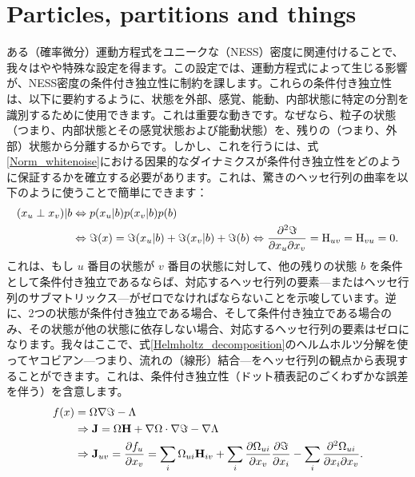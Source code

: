 \documentclass[a4paper, titlepage]{jsarticle}
\begin{document}
\section{Particles, partitions and things}
ある（確率微分）運動方程式をユニークな（NESS）密度に関連付けることで、我々はやや特殊な設定を得ます。この設定では、運動方程式によって生じる影響が、NESS密度の条件付き独立性に制約を課します。これらの条件付き独立性は、以下に要約するように、状態を外部、感覚、能動、内部状態に特定の分割を識別するために使用できます。これは重要な動きです。なぜなら、粒子の状態（つまり、内部状態とその感覚状態および能動状態）を、残りの（つまり、外部）状態から分離するからです。しかし、これを行うには、式\eqref{Norm_whitenoise}における因果的なダイナミクスが条件付き独立性をどのように保証するかを確立する必要があります。これは、驚きのヘッセ行列の曲率を以下のように使うことで簡単にできます：
\begin{equation}\label{Surprise_Hessian}
    \begin{aligned}
        (x_u\perp x_v)|b&\Leftrightarrow p\qty(x_u|b)p\qty(x_v|b)p\qty(b) \\
        &\Leftrightarrow\imaginary\qty(x)=\imaginary\qty(x_u|b)+\imaginary\qty(x_v|b)+\imaginary\qty(b)\Leftrightarrow\frac{\partial^2\imaginary}{\partial x_u\partial x_v}=\mathrm{H}_{uv}=\mathrm{H}_{vu}=0.
    \end{aligned}
\end{equation}
これは、もし $u$ 番目の状態が $v$ 番目の状態に対して、他の残りの状態 $b$ を条件として条件付き独立であるならば、対応するヘッセ行列の要素—またはヘッセ行列のサブマトリックス—がゼロでなければならないことを示唆しています。逆に、2つの状態が条件付き独立である場合、そして条件付き独立である場合のみ、その状態が他の状態に依存しない場合、対応するヘッセ行列の要素はゼロになります。我々はここで、式\eqref{Helmholtz_decomposition}のヘルムホルツ分解を使ってヤコビアン—つまり、流れの（線形）結合—をヘッセ行列の観点から表現することができます。これは、条件付き独立性（ドット積表記のごくわずかな誤差を伴う）を含意します。
\begin{equation}\label{flow_Hessian}
    \begin{aligned}
        f(x) &= \Omega\nabla\imaginary-\Lambda \\
        &\Rightarrow \mathbf{J} = \Omega\mathbf{H} + \nabla\Omega \cdot \nabla\imaginary - \nabla\Lambda \\
        &\Rightarrow \mathbf{J}_{uv} = \frac{\partial f_u}{\partial x_v} = \sum_i \Omega_{ui} \mathbf{H}_{iv} + \sum_i \frac{\partial \Omega_{ui}}{\partial x_v}\frac{\partial\imaginary}{\partial x_i} - \sum_i \frac{\partial^2 \Omega_{ui}}{\partial x_i \partial x_v}.
    \end{aligned}
\end{equation}
\end{document}
